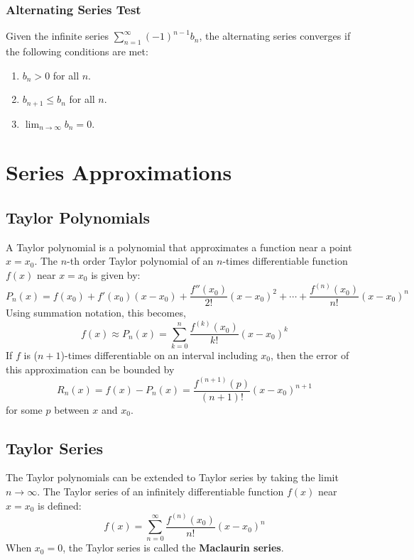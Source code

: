 \documentclass{article}
\begin{document}
\subsubsection{Alternating Series Test}
Given the infinite series \(\sum_{n=1}^{\infty} {\left( -1 \right)}^{n-1} b_n\),
the alternating series converges if the following conditions are met:
\begin{enumerate}[label=(\arabic*)]
    \item \(b_n > 0\) for all \(n\).
    \item \(b_{n+1} \leq b_n\) for all \(n\).
    \item \(\lim_{n \to \infty} b_n = 0\).
\end{enumerate}
\section{Series Approximations}
\subsection{Taylor Polynomials}
A Taylor polynomial is a polynomial that approximates a function near a
point \(x = x_0\). The \(n\)-th order Taylor polynomial of an
\(n\)-times differentiable function \(f\left( x \right)\) near
\(x = x_0\) is given by:
\begin{equation*}
    P_n\left( x \right) = f\left( x_0 \right) + f'\left( x_0 \right) \left( x - x_0 \right) + \frac{f''\left( x_0 \right)}{2!} {\left( x - x_0 \right)}^2 + \cdots + \frac{f^{\left( n \right)}\left( x_0 \right)}{n!} {\left( x - x_0 \right)}^n
\end{equation*}
Using summation notation, this becomes,
\begin{equation*}
    f\left( x \right) \approx P_n\left( x \right) = \sum_{k=0}^{n} \frac{f^{\left( k \right)}\left( x_0 \right)}{k!} {\left( x - x_0 \right)}^k
\end{equation*}
If \(f\) is (\(n+1\))-times differentiable on an interval including
\(x_0\), then the error of this approximation can be bounded by
\begin{equation*}
    R_n\left( x \right) = f\left( x \right) - P_n\left( x \right) = \frac{f^{\left( n+1 \right)}\left( p \right)}{\left( n+1 \right)!} {\left( x - x_0 \right)}^{n+1}
\end{equation*}
for some \(p\) between \(x\) and \(x_0\).
\subsection{Taylor Series}
The Taylor polynomials can be extended to Taylor series by taking the
limit \(n \to \infty\). The Taylor series of an infinitely
differentiable function \(f\left( x \right)\) near \(x = x_0\) is
defined:
\begin{equation*}
    f\left( x \right) = \sum_{n=0}^{\infty} \frac{f^{\left( n \right)}\left( x_0 \right)}{n!} {\left( x - x_0 \right)}^n
\end{equation*}
When \(x_0 = 0\), the Taylor series is called the \textbf{Maclaurin series}.
\end{document}
